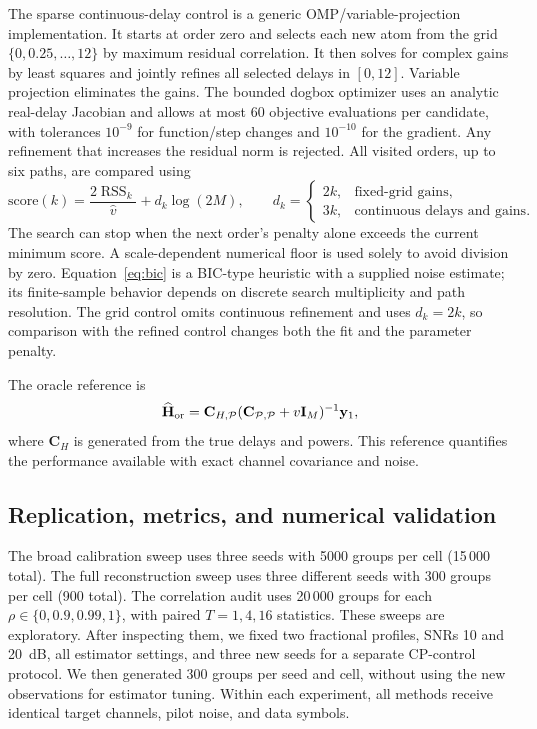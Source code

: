The sparse continuous-delay control is a generic OMP/variable-projection
implementation. It starts at order zero and selects each new atom from the grid
$\{0,0.25,\ldots,12\}$ by maximum residual correlation. It then solves for
complex gains by least squares and jointly refines all selected delays in $[0,12]$.
Variable projection eliminates the gains. The bounded dogbox optimizer uses an
analytic real-delay Jacobian and allows at most 60 objective evaluations per
candidate, with tolerances $10^{-9}$ for function/step changes and $10^{-10}$
for the gradient. Any refinement that increases the residual norm is rejected.
All visited orders, up to six paths, are compared using
\begin{equation}
 \mathrm{score}(k)=\frac{2\operatorname{RSS}_k}{\widehat v}
                  +d_k\log(2M),\qquad
 d_k=\begin{cases}2k,&\text{fixed-grid gains},\\3k,&\text{continuous delays and gains}.
 \end{cases}
 \label{eq:bic}
\end{equation}
The search can stop when the next order's penalty alone exceeds the current
minimum score. A scale-dependent numerical floor is used solely to avoid
division by zero. Equation~\eqref{eq:bic} is a BIC-type heuristic
with a supplied noise estimate; its finite-sample behavior depends on discrete
search multiplicity and path resolution. The grid
control omits continuous refinement and uses $d_k=2k$, so comparison with
the refined control changes both the fit and the parameter penalty.

The oracle reference is
\begin{equation}
 \widehat{\mathbf H}_{\rm or}=
 \mathbf C_{H,\mathcal P}
 (\mathbf C_{\mathcal P,\mathcal P}+v\mathbf I_M)^{-1}\mathbf y_1,
 \label{eq:oracle}
\end{equation}
where $\mathbf C_H$ is generated from the true delays and powers. This reference
quantifies the performance available with exact channel covariance and noise.



\subsection{Replication, metrics, and numerical validation}
\label{sec:reproducibility}
The broad calibration sweep uses three seeds with 5000 groups per cell
(15\,000 total). The full reconstruction sweep uses three different seeds with
300 groups per cell (900 total). The correlation audit uses 20\,000 groups
for each $\rho\in\{0,0.9,0.99,1\}$, with paired $T=1,4,16$ statistics.
These sweeps are exploratory. After inspecting them, we fixed two fractional
profiles, SNRs 10 and 20~dB, all estimator settings, and three new seeds for
a separate CP-control protocol. We then generated 300 groups per seed and cell,
without using the new observations for estimator tuning. Within each experiment,
all methods receive identical target channels, pilot noise, and data symbols.

